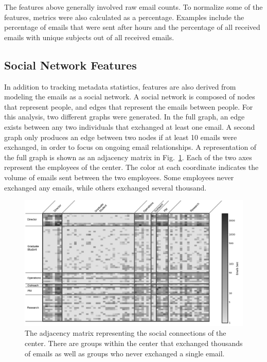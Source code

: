 \documentclass[10pt,twocolumn,conference]{IEEEtran}
\begin{document}
The features above generally involved raw email counts.
To normalize some of the features, metrics were also calculated as a percentage.
Examples include the percentage of emails that were sent after hours and the percentage of all received emails with unique subjects out of all received emails.

\subsection{Social Network Features}
In addition to tracking metadata statistics, features are also derived from modeling the emails as a social network.
A social network is composed of nodes that represent people, and edges that represent the emails between people.  For this analysis, two different graphs were generated.
In the full graph, an edge exists between any two individuals that exchanged at least one email.
A second graph only produces an edge between two nodes if at least 10 emails were exchanged, in order to focus on ongoing email relationships.
A representation of the full graph is shown as an adjacency matrix in Fig.~\ref{fig:adj_matrix}.
Each of the two axes represent the employees of the center.
The color at each coordinate indicates the volume of emails sent between the two employees.
Some employees never exchanged any emails, while others exchanged several thousand.

\begin{figure}[t]
    \centering
    \includegraphics[width=\columnwidth,trim={4mm 1mm 0mm 5mm},clip]{ViridisEdit_inv}
    \caption{The adjacency matrix representing the social connections of the center.  There are groups within the center that exchanged thousands of emails as well as groups who never exchanged a single email.}
    \label{fig:adj_matrix}
\end{figure}
\end{document}
